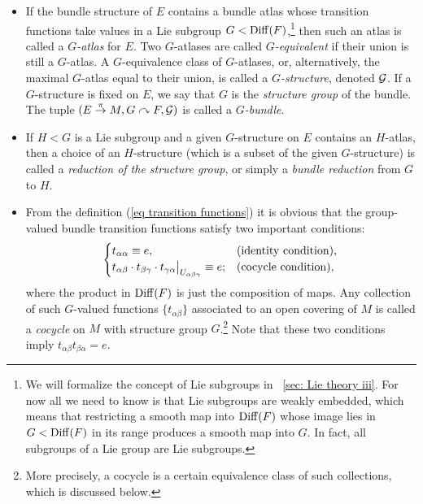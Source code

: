 \begin{defn}
\begin{itemize}
    \item If the bundle structure of $E$ contains a bundle atlas whose transition functions take values in a Lie subgroup $G<\operatorname{Diff}(F)$,\footnote{We will formalize the concept of Lie subgroups in \Sect~\ref{sec: Lie theory iii}. For now all we need to know is that Lie subgroups are weakly embedded, which means that restricting a smooth map into $\operatorname{Diff}(F)$ whose image lies in $G<\operatorname{Diff}(F)$ in its range produces a smooth map into $G$. In fact, all subgroups of a Lie group are Lie subgroups.} then such an atlas is called a \emph{$G$-atlas} for $E$. Two $G$-atlases are called \emph{$G$-equivalent} if their union is still a $G$-atlas. A $G$-equivalence class of $G$-atlases, or, alternatively, the maximal $G$-atlas equal to their union, is called a \emph{$G$-structure}, denoted $\mathcal{G}$. If a $G$-structure is fixed on $E$, we say that $G$ is the \emph{structure group} of the bundle.  The tuple $(E\overset{\pi}{\to}M,G\curvearrowright F,\mathcal{G})$ is called a \emph{$G$-bundle}.
    
    \item If $H<G$ is a Lie subgroup and a given $G$-structure on $E$ contains an $H$-atlas, then a choice of an $H$-structure (which is a subset of the given $G$-structure) is called a \emph{reduction of the structure group}, or simply a \emph{bundle reduction} from $G$ to $H$.
    
    \item From the definition (\ref{eq transition functions}) it is obvious that the group-valued bundle transition functions satisfy two important conditions:
    \[
    \begin{cases}
    t_{\alpha\alpha}\equiv e, & \text{(identity condition),}\\
    \restr{t_{\alpha\beta}\cdot t_{\beta\gamma}\cdot t_{\gamma\alpha}}{U_{\alpha\beta\gamma}}\equiv e; & \text{(cocycle condition),}
    \end{cases}
    \]
    where the product in $\operatorname{Diff}(F)$ is just the composition of maps. Any collection of such $G$-valued functions $\{t_{\alpha\beta}\}$ associated to an open covering of $M$ is called a \emph{cocycle} on $M$ with structure group $G$.\footnote{More precisely, a cocycle is a certain equivalence class of such collections, which is discussed below.} Note that these two conditions imply $t_{\alpha\beta}t_{\beta\alpha}=e$.
\end{itemize}
\end{defn}

